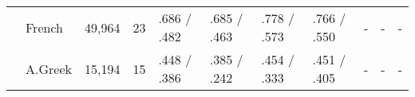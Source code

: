 \begin{landscape}
\begin{table}[ht]
\begin{tabular}{|l|l|l|l|p{2cm}|p{2cm}|p{2cm}|p{2cm}|p{2cm}|p{2cm}|p{2cm}|}
        & French     & 49,964  & 23   & .686 / .482   & .685 / .463   & .778 / .573   & .766 / .550   & -           & -               & -        \\
        & A.Greek    & 15,194  & 15   & .448 / .386   & .385 / .242   & .454 / .333  & .451 / .405    & -           & -               & -        \\ \hline
    \end{tabular}
\end{table}
\end{landscape}
